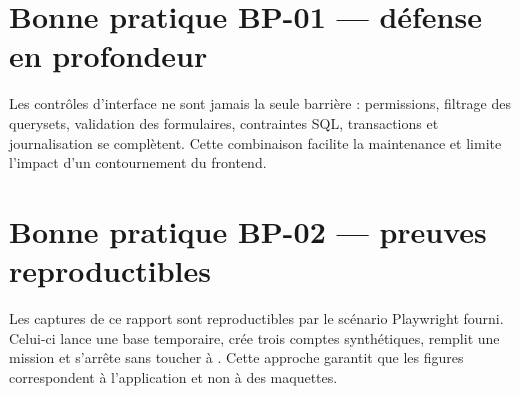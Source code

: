 \section*{Bonne pratique BP-01 --- d\'efense en profondeur}
Les contr\^oles d'interface ne sont jamais la seule barri\`ere : permissions, filtrage des querysets, validation des formulaires, contraintes SQL, transactions et journalisation se compl\`etent. Cette combinaison facilite la maintenance et limite l'impact d'un contournement du frontend.

\section*{Bonne pratique BP-02 --- preuves reproductibles}
Les captures de ce rapport sont reproductibles par le sc\'enario Playwright fourni. Celui-ci lance une base temporaire, cr\'ee trois comptes synth\'etiques, remplit une mission et s'arr\^ete sans toucher \`a . Cette approche garantit que les figures correspondent \`a l'application et non \`a des maquettes.
